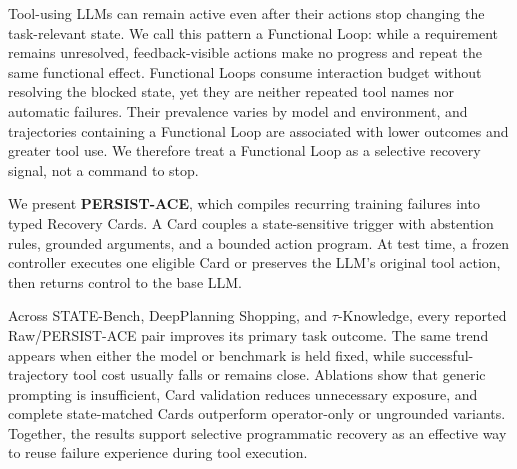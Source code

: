 Tool-using LLMs can remain active even after their actions stop changing the
task-relevant state. We call this pattern a Functional Loop: while a
requirement remains unresolved, feedback-visible actions make no progress and
repeat the same functional effect. Functional Loops consume interaction budget without
resolving the blocked state, yet they are neither repeated tool names nor
automatic failures. Their prevalence varies by model and environment,
and trajectories containing a Functional Loop are associated with lower outcomes and greater tool
use. We therefore treat a Functional Loop as a selective recovery signal, not a command to
stop.

We present \textbf{PERSIST-ACE}, which compiles recurring training failures
into typed Recovery Cards. A Card couples a state-sensitive trigger with
abstention rules, grounded arguments, and a bounded action program. At test
time, a frozen controller executes one eligible Card or preserves the LLM's
original tool action, then returns control to the base LLM.

Across STATE-Bench, DeepPlanning Shopping, and $\tau$-Knowledge, every reported
Raw/PERSIST-ACE pair improves its primary task outcome. The same trend appears
when either the model or benchmark is held fixed, while successful-trajectory
tool cost usually falls or remains close. Ablations show that generic
prompting is insufficient, Card validation reduces unnecessary exposure,
and complete state-matched Cards outperform operator-only or ungrounded variants.
Together, the results support selective programmatic recovery as an effective
way to reuse failure experience during tool execution.
